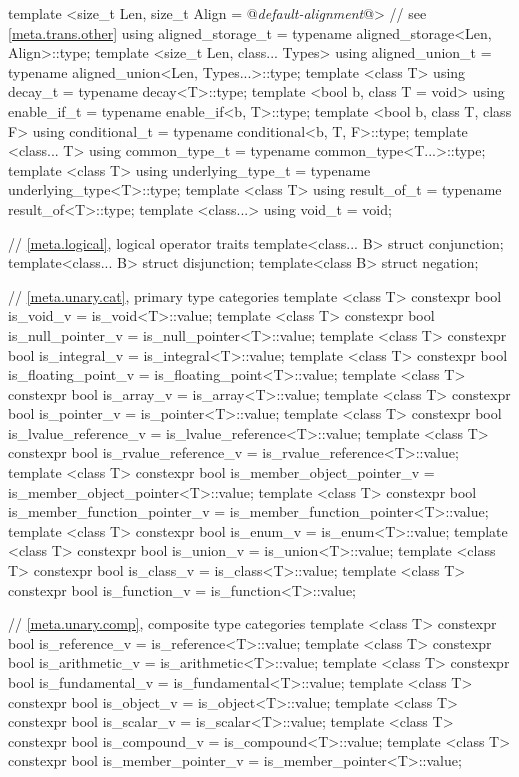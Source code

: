 \begin{codeblock}
{  template <size_t Len,
            size_t Align = @\textit{default-alignment}@> // see \ref{meta.trans.other}
    using aligned_storage_t = typename aligned_storage<Len, Align>::type;
  template <size_t Len, class... Types>
    using aligned_union_t   = typename aligned_union<Len, Types...>::type;
  template <class T>
    using decay_t           = typename decay<T>::type;
  template <bool b, class T = void>
    using enable_if_t       = typename enable_if<b, T>::type;
  template <bool b, class T, class F>
    using conditional_t     = typename conditional<b, T, F>::type;
  template <class... T>
    using common_type_t     = typename common_type<T...>::type;
  template <class T>
    using underlying_type_t = typename underlying_type<T>::type;
  template <class T>
    using result_of_t       = typename result_of<T>::type;
  template <class...>
    using void_t            = void;

  // \ref{meta.logical}, logical operator traits
  template<class... B> struct conjunction;
  template<class... B> struct disjunction;
  template<class B> struct negation;

  // \ref{meta.unary.cat}, primary type categories
  template <class T> constexpr bool is_void_v
    = is_void<T>::value;
  template <class T> constexpr bool is_null_pointer_v
    = is_null_pointer<T>::value;
  template <class T> constexpr bool is_integral_v
    = is_integral<T>::value;
  template <class T> constexpr bool is_floating_point_v
    = is_floating_point<T>::value;
  template <class T> constexpr bool is_array_v
    = is_array<T>::value;
  template <class T> constexpr bool is_pointer_v
    = is_pointer<T>::value;
  template <class T> constexpr bool is_lvalue_reference_v
    = is_lvalue_reference<T>::value;
  template <class T> constexpr bool is_rvalue_reference_v
    = is_rvalue_reference<T>::value;
  template <class T> constexpr bool is_member_object_pointer_v
    = is_member_object_pointer<T>::value;
  template <class T> constexpr bool is_member_function_pointer_v
    = is_member_function_pointer<T>::value;
  template <class T> constexpr bool is_enum_v
    = is_enum<T>::value;
  template <class T> constexpr bool is_union_v
    = is_union<T>::value;
  template <class T> constexpr bool is_class_v
    = is_class<T>::value;
  template <class T> constexpr bool is_function_v
    = is_function<T>::value;

  // \ref{meta.unary.comp}, composite type categories
  template <class T> constexpr bool is_reference_v
    = is_reference<T>::value;
  template <class T> constexpr bool is_arithmetic_v
    = is_arithmetic<T>::value;
  template <class T> constexpr bool is_fundamental_v
    = is_fundamental<T>::value;
  template <class T> constexpr bool is_object_v
    = is_object<T>::value;
  template <class T> constexpr bool is_scalar_v
    = is_scalar<T>::value;
  template <class T> constexpr bool is_compound_v
    = is_compound<T>::value;
  template <class T> constexpr bool is_member_pointer_v
    = is_member_pointer<T>::value;

}
\end{codeblock}
